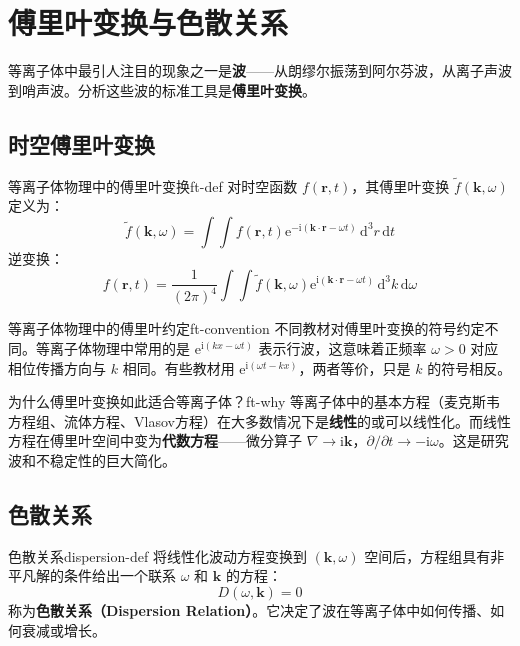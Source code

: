 \documentclass[12pt,a4paper,openany,oneside]{book}
\newcommand{\diff}{\mathrm{d}}
\newcommand{\ii}{\mathrm{i}}
\newcommand{\ee}{\mathrm{e}}
\newcommand{\vect}[1]{\bm{#1}}
\newcommand{\grad}{\nabla}
\newcommand{\difficulty}[1]{\marginnote{\hfill\textcolor{coverMid!80}{\rule[-0.1em]{2pt}{0.9em}}\,\textcolor{coverMid}{\footnotesize\textbf{[#1]}}}}
\begin{document}
\section{傅里叶变换与色散关系}\difficulty{基础}

等离子体中最引人注目的现象之一是\textbf{波}——从朗缪尔振荡到阿尔芬波，从离子声波到哨声波。分析这些波的标准工具是\textbf{傅里叶变换}。

\subsection{时空傅里叶变换}

\begin{definition}{等离子体物理中的傅里叶变换}{ft-def}
对时空函数 $f(\vect{r},t)$，其傅里叶变换 $\tilde{f}(\vect{k},\omega)$ 定义为：
\[
\tilde{f}(\vect{k},\omega) = \int\int f(\vect{r},t) \ee^{-\ii(\vect{k}\cdot\vect{r} - \omega t)}\,\diff^3r\,\diff t
\]
逆变换：
\[
f(\vect{r},t) = \frac{1}{(2\pi)^4} \int\int \tilde{f}(\vect{k},\omega) \ee^{\ii(\vect{k}\cdot\vect{r} - \omega t)}\,\diff^3k\,\diff\omega
\]
\end{definition}

\begin{tip}{等离子体物理中的傅里叶约定}{ft-convention}
不同教材对傅里叶变换的符号约定不同。等离子体物理中常用的是 $\ee^{\ii(kx-\omega t)}$ 表示行波，这意味着正频率 $\omega>0$ 对应相位传播方向与 $k$ 相同。有些教材用 $\ee^{\ii(\omega t - kx)}$，两者等价，只是 $k$ 的符号相反。
\end{tip}

\begin{insight}{为什么傅里叶变换如此适合等离子体？}{ft-why}
等离子体中的基本方程（麦克斯韦方程组、流体方程、Vlasov方程）在大多数情况下是\textbf{线性}的或可以线性化。而线性方程在傅里叶空间中变为\textbf{代数方程}——微分算子 $\grad \to \ii\vect{k}$，$\partial/\partial t \to -\ii\omega$。这是研究波和不稳定性的巨大简化。
\end{insight}

\subsection{色散关系}

\begin{definition}{色散关系}{dispersion-def}
将线性化波动方程变换到 $(\vect{k},\omega)$ 空间后，方程组具有非平凡解的条件给出一个联系 $\omega$ 和 $\vect{k}$ 的方程：
\[
D(\omega, \vect{k}) = 0
\]
称为\textbf{色散关系（Dispersion Relation）}。它决定了波在等离子体中如何传播、如何衰减或增长。
\end{definition}
\end{document}
